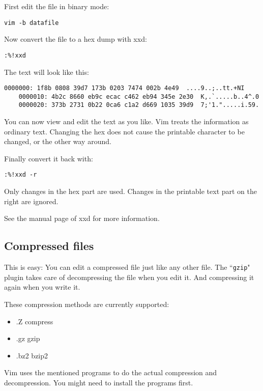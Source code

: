First edit the file in binary mode:

\begin{Verbatim}[samepage=true]
 vim -b datafile
\end{Verbatim}

Now convert the file to a hex dump with xxd:

\begin{Verbatim}[samepage=true]
 :%!xxd
\end{Verbatim}

The text will look like this:

\begin{Verbatim}[samepage=true]
    0000000: 1f8b 0808 39d7 173b 0203 7474 002b 4e49  ....9..;..tt.+NI 
    0000010: 4b2c 8660 eb9c ecac c462 eb94 345e 2e30  K,.`.....b..4^.0 
    0000020: 373b 2731 0b22 0ca6 c1a2 d669 1035 39d9  7;'1.".....i.59. 
\end{Verbatim}

You can now view and edit the text as you like.
Vim treats the information as ordinary text.
Changing the hex does not cause the printable character to be changed, or the other way around.

Finally convert it back with:

\begin{Verbatim}[samepage=true]
 :%!xxd -r
\end{Verbatim}

Only changes in the hex part are used.
Changes in the printable text part on the right are ignored.

See the manual page of xxd for more information.
\subsection{Compressed files}
This is easy: You can edit a compressed file just like any other file.
The ``\texttt{gzip}" plugin takes care of decompressing the file when you edit it.
And compressing it again when you write it.

These compression methods are currently supported:
\begin{itemize}
				\item .Z    compress
				\item .gz   gzip
				\item .bz2  bzip2
\end{itemize}
Vim uses the mentioned programs to do the actual compression and decompression.
You might need to install the programs first.
\clearpage
